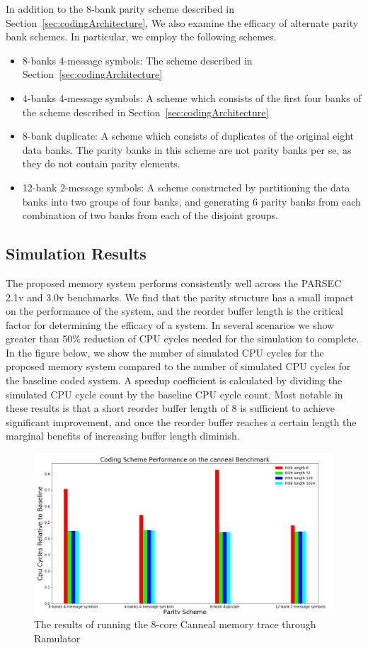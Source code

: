 In addition to the 8-bank parity scheme described in Section~\ref{sec:codingArchitecture}, We also examine the efficacy of alternate parity bank schemes. In particular, we employ the following schemes.
\begin{itemize}
	\item 8-banks 4-message symbols: The scheme described in Section~\ref{sec:codingArchitecture}
	\item 4-banks 4-message symbols: A scheme which consists of the first four banks of the scheme described in Section~\ref{sec:codingArchitecture} 
	\item 8-bank duplicate: A scheme which consists of duplicates of the original eight data banks. The parity banks in this scheme are not parity banks per se, as they do not contain parity elements.
	\item 12-bank 2-message symbols: A scheme constructed by partitioning the data banks into two groups of four banks, and generating 6 parity banks from each combination of two banks from each of the disjoint groups.
\end{itemize}

\subsection{Simulation Results}
\label{sec:results}
The proposed memory system performs consistently well across the PARSEC 2.1v and 3.0v benchmarks. We find that the parity structure has a small impact on the performance of the system, and the reorder buffer length is  the critical factor for determining the efficacy of a system. In several scenarios we show greater than 50\% reduction of CPU cycles needed for the simulation to complete. In the figure below, we show the number of simulated CPU cycles for the proposed memory system compared to the number of simulated CPU cycles for the baseline coded system. A speedup coefficient is calculated by dividing the simulated CPU cycle count by the baseline CPU cycle count. Most notable in these results is that a short reorder buffer length of 8 is sufficient to achieve significant improvement, and once the reorder buffer reaches a certain length the marginal benefits of increasing buffer length diminish.

\begin{figure}[h!]
		\includegraphics[width=\linewidth]{figures/canneal_results.png}
		\caption{The results of running the 8-core Canneal memory trace through Ramulator}
		\label{fig:canneal_results}
\end{figure}
		

